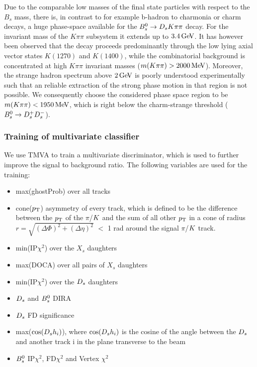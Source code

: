 Due to the comparable low masses of the final state particles  with respect to the $B_s$ mass,
there is, in contrast to for example b-hadron to charmonia or charm decays, a huge phase-space available for the ${{B}^0_{s}}\rightarrow{\ensuremath{{D}_{s}}}{\ensuremath{K}}{\ensuremath{\pi}}{\ensuremath{\pi}}$ decay.
For the invariant mass of the $K\pi\pi$ subsystem it extends up to $3.4 \mathrm{\,Ge\kern -0.1em V}$.
It has however been observed that the decay proceeds predominantly through the low lying axial vector states $K(1270)$ and $K(1400)$, while
the combinatorial background is concentrated at high $K\pi\pi$ invariant masses ($m(K\pi\pi) > 2000 \mathrm{\,Me\kern -0.1em V}$).
Moreover, the strange hadron spectrum above $2\mathrm{\,Ge\kern -0.1em V}$ is poorly understood experimentally such that an reliable extraction of the strong phase motion in that region is not possible.
We consequently choose the considered phase space region to be $m(K\pi\pi) < 1950 \mathrm{\,Me\kern -0.1em V}$, which is right below the charm-strange threshold (${{B}^0_{s}}\rightarrow{\ensuremath{{D}^+_{s}}}{\ensuremath{{D}^-_{s}}}$).


\clearpage
\subsubsection{Training of multivariate classifier}

We use TMVA \cite{Hocker:2007ht} to train a multivariate discriminator, which is used to further improve the signal to background ratio. 
The following variables are used for the training:

\begin{itemize} 

\item max(ghostProb) over all tracks

\item cone($\mbox{$p_{\mathrm{ T}}$}$) asymmetry of every track, 
which is defined to be the difference between the $\mbox{$p_{\mathrm{ T}}$}$ of the $\pi$/${K}$ and the sum of all other $\mbox{$p_{\mathrm{ T}}$}$ in a cone of radius $r = \sqrt{(\Delta\Phi)^{2} + (\Delta\eta)^{2}}$ $<$ 1 rad around the signal $\pi$/${K}$ track.

\item min(IP$\chi^{2}$) over the $X_{s}$ daughters

\item max(DOCA) over all pairs of $X_{s}$ daughters

\item min(IP$\chi^{2}$) over the ${{D}_{s}}$ daughters

\item ${{D}_{s}}$ and ${{B}^0_{s}}$ DIRA

\item ${{D}_{s}}$ FD significance

\item max($\cos({{D}_{s}} h_{i})$), where $\cos({{D}_{s}} h_{i})$ is the cosine of the angle between the ${{D}_{s}}$ and another track i in the plane transverse to the beam

\item ${{B}^0_{s}}$ IP$\chi^{2}$, FD$\chi^{2}$ and Vertex $\chi^{2}$

\end{itemize}

